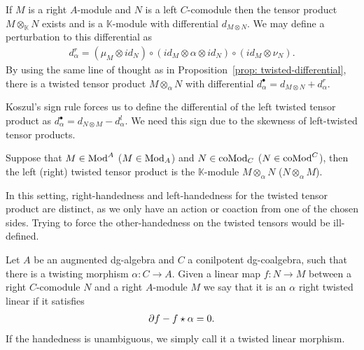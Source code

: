 \documentclass[../thesis.tex]{subfiles}
\begin{document}
            If $M$ is a right $A$-module and $N$ is a left $C$-comodule then the tensor product $M\otimes_\mathbb{K} N$ exists and is a $\mathbb{K}$-module with differential $d_{M\otimes N}$. We may define a perturbation to this differential as 
            \begin{align*}
                d_\alpha^r = (\mu_M\otimes id_N) \circ (id_M \otimes \alpha \otimes id_N) \circ (id_M \otimes \nu_N).
            \end{align*}
            By using the same line of thought as in Proposition~\ref{prop: twisted-differential}, there is a twisted tensor product $M\otimes_\alpha N$ with differential $d_\alpha^\bullet = d_{M\otimes N} + d_\alpha^r$.

            \begin{remark}
                Koszul's sign rule forces us to define the differential of the left twisted tensor product as $d_\alpha^\bullet = d_{N\otimes M} - d_\alpha^l$. We need this sign due to the skewness of left-twisted tensor products.
            \end{remark}
            
            \begin{definition}
                Suppose that $M\in \tt{Mod}^A$ ($M\in \tt{Mod}_A$) and $N\in \tt{coMod}_C$ ($N\in \tt{coMod}^C$), then the left (right) twisted tensor product is the $\mathbb{K}$-module $M\otimes_\alpha N$ ($N\otimes_\alpha M$).
            \end{definition}

            In this setting, right-handedness and left-handedness for the twisted tensor product are distinct, as we only have an action or coaction from one of the chosen sides. Trying to force the other-handedness on the twisted tensors would be ill-defined.

            \begin{definition}
                Let $A$ be an augmented dg-algebra and $C$ a conilpotent dg-coalgebra, such that there is a twisting morphism $\alpha: C\rightarrow A$. Given a linear map $f: N \rightarrow M$ between a right $C$-comodule $N$ and a right $A$-module $M$ we say that it is an $\alpha$ right twisted linear if it satisfies
                \begin{align*}
                    \partial f - f\star \alpha = 0\tt{.}
                \end{align*}
                If the handedness is unambiguous, we simply call it a twisted linear morphism.
            \end{definition}
\end{document}
